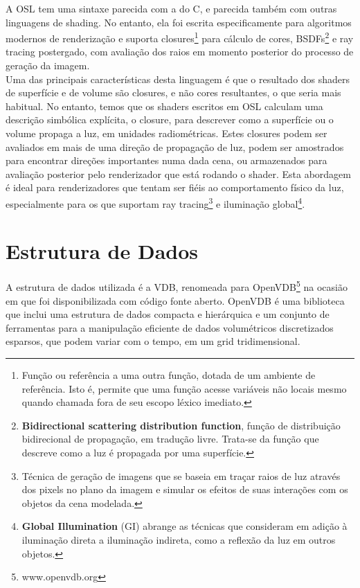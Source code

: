 \documentclass[12pt, a4paper, oneside]{book}
\begin{document}
A OSL tem uma sintaxe parecida com a do C, e parecida também com outras linguagens de shading. No entanto, ela foi escrita especificamente para algoritmos modernos de renderização e suporta closures\footnote{Função ou referência a uma outra função, dotada de um ambiente de referência. Isto é, permite que uma função acesse variáveis não locais mesmo quando chamada fora de seu escopo léxico imediato.} para cálculo de cores, BSDFs\footnote{{\bf Bidirectional scattering distribution function}, função de distribuição bidirecional de propagação, em tradução livre. Trata-se da função que descreve como a luz é propagada por uma superfície.} e ray tracing postergado, com avaliação dos raios em momento posterior do processo de geração da imagem. \\

Uma das principais características desta linguagem é que o resultado dos shaders de superfície e de volume são closures, e não cores resultantes, o que seria mais habitual.
No entanto, temos que os shaders escritos em OSL calculam uma descrição simbólica explícita, o closure, para descrever como a superfície ou o volume propaga a luz, em unidades radiométricas. Estes closures podem ser avaliados em mais de uma direção de propagação de luz, podem ser amostrados para encontrar direções importantes numa dada cena, ou armazenados para avaliação posterior pelo renderizador que está rodando o shader. Esta abordagem é ideal para renderizadores que tentam ser fiéis ao comportamento físico da luz, especialmente para os que suportam ray tracing\footnote{Técnica de geração de imagens que se baseia em traçar raios de luz através dos pixels no plano da imagem e simular os efeitos de suas interações com os objetos da cena modelada.} e iluminação global\footnote{{\bf Global Illumination} (GI) abrange as técnicas que consideram em adição à iluminação direta a iluminação indireta, como a reflexão da luz em outros objetos.}.





%
%

\chapter{Estrutura de Dados}
\label{data_struct}
A estrutura de dados utilizada é a VDB, renomeada para OpenVDB\footnote{www.openvdb.org} na ocasião em que foi disponibilizada com código fonte aberto. OpenVDB é uma biblioteca que inclui uma estrutura de dados compacta e hierárquica e um conjunto de ferramentas para a manipulação eficiente de dados volumétricos discretizados esparsos, que podem variar com o tempo, em um grid tridimensional. \\
\end{document}
